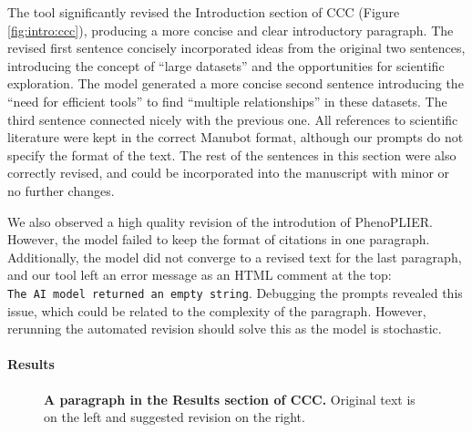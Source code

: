 \documentclass[
]{article}
\begin{document}
The tool significantly revised the Introduction section of CCC (Figure \ref{fig:intro:ccc}), producing a more concise and clear introductory paragraph.
The revised first sentence concisely incorporated ideas from the original two sentences, introducing the concept of ``large datasets'' and the opportunities for scientific exploration.
The model generated a more concise second sentence introducing the ``need for efficient tools'' to find ``multiple relationships'' in these datasets.
The third sentence connected nicely with the previous one.
All references to scientific literature were kept in the correct Manubot format, although our prompts do not specify the format of the text.
The rest of the sentences in this section were also correctly revised, and could be incorporated into the manuscript with minor or no further changes.

We also observed a high quality revision of the introdution of PhenoPLIER.
However, the model failed to keep the format of citations in one paragraph.
Additionally, the model did not converge to a revised text for the last paragraph, and our tool left an error message as an HTML comment at the top: \texttt{The\ AI\ model\ returned\ an\ empty\ string}.
Debugging the prompts revealed this issue, which could be related to the complexity of the paragraph.
However, rerunning the automated revision should solve this as the model is stochastic.

\hypertarget{results}{%
\paragraph{Results}\label{results}}

\begin{figure}
\hypertarget{fig:results:ccc}{%
\centering

\caption{\textbf{A paragraph in the Results section of CCC.}
Original text is on the left and suggested revision on the right.}\label{fig:results:ccc}
}
\end{figure}
\end{document}
